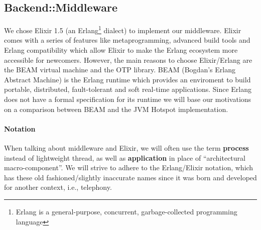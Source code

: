 \subsection{Backend::Middleware}
We chose Elixir 1.5 (an Erlang\footnote{Erlang is a general-purpose, concurrent, garbage-collected programming language} dialect) to implement
our middleware. Elixir comes with a series of features like metaprogramming,
advanced build tools and Erlang compatibility which allow Elixir to make the
Erlang ecosystem more accessible for newcomers.
However, the main reasons to choose Elixir/Erlang are the BEAM virtual machine
and the OTP library.
BEAM (Bogdan's Erlang Abstract Machine) is the Erlang runtime which provides an
enviroment to build portable, distributed, fault-tolerant and soft real-time
applications.
Since Erlang does not have a formal specification for its runtime we will
base our motivations on a comparison between BEAM and the JVM Hotspot
implementation\cite{poolcomparison}.

\paragraph{Notation}
When talking about middleware and Elixir, we will often use the term
\textbf{process} instead of lightweight thread, as well as \textbf{application}
in place of ``architectural macro-component''.
We will strive to adhere
to the Erlang/Elixir notation, which has these old fashioned/slightly inaccurate
names since it was born and developed for another context, i.e., telephony.

